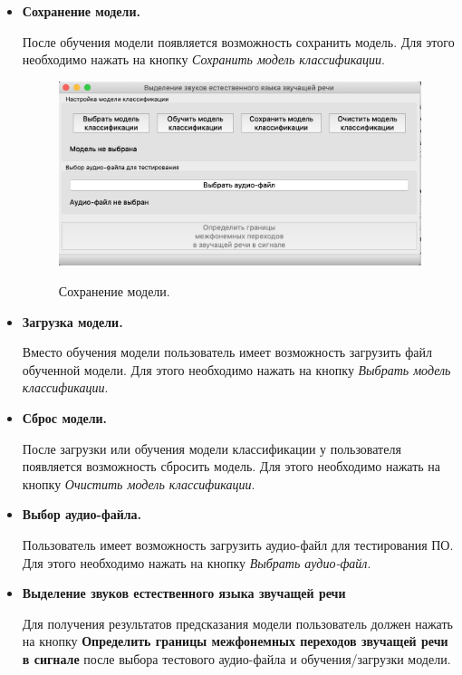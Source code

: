 \documentclass[utf8x, 14pt, oneside, a4paper]{article}
\begin{document}
\begin{itemize}
		\item {\bf Сохранение модели.}
		
		После обучения модели появляется возможность сохранить модель. Для этого необходимо нажать на кнопку \textit{Сохранить модель классификации}.
		
		\begin{figure}[h!]
			\begin{center}
				{\includegraphics[scale = 0.6]{img/save_model.png}}
			\end{center}
			\caption{Сохранение модели.}
			\label{ris:save_mode}
		\end{figure}
		
		\item {\bf Загрузка модели.}
		
		Вместо обучения модели пользователь имеет возможность загрузить файл обученной модели. Для этого необходимо нажать на кнопку \textit{Выбрать модель классификации}.
		
		\item {\bf Сброс модели.}
		
		После загрузки или обучения модели классификации у пользователя появляется возможность сбросить модель. Для этого необходимо нажать на кнопку \textit{Очистить модель классификации}.
		
		\item {\bf Выбор аудио-файла.}
		
		Пользователь имеет возможность загрузить аудио-файл для тестирования ПО. Для этого необходимо нажать на кнопку \textit{Выбрать аудио-файл}.
		
		\item {\bf Выделение звуков естественного языка звучащей речи}
		
		Для получения результатов предсказания модели пользователь должен нажать на кнопку {\bf Определить границы межфонемных переходов звучащей речи в сигнале} после выбора тестового аудио-файла и обучения/загрузки модели.
		

\end{itemize}
\end{document}
